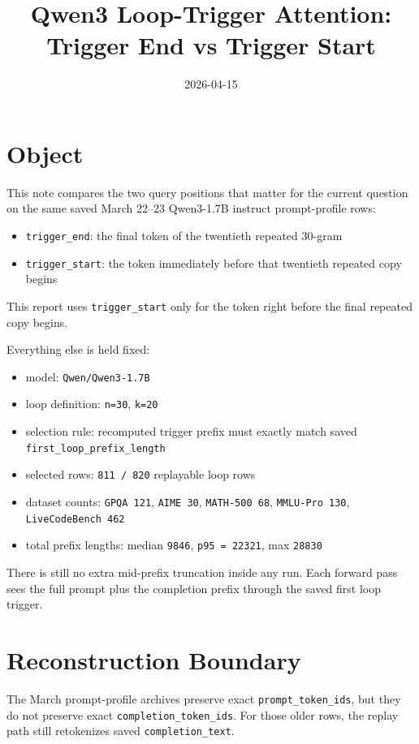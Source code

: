 \documentclass[11pt]{article}
\title{Qwen3 Loop-Trigger Attention: Trigger End vs Trigger Start}
\author{}
\date{2026-04-15}
\begin{document}
\maketitle

\section*{Object}

This note compares the two query positions that matter for the current question on the same saved March 22--23 Qwen3-1.7B instruct prompt-profile rows:

\begin{itemize}
  \item \texttt{trigger\_end}: the final token of the twentieth repeated $30$-gram
  \item \texttt{trigger\_start}: the token immediately before that twentieth repeated copy begins
\end{itemize}

This report uses \texttt{trigger\_start} only for the token right before the final repeated copy begins.

Everything else is held fixed:

\begin{itemize}
  \item model: \texttt{Qwen/Qwen3-1.7B}
  \item loop definition: \texttt{n=30}, \texttt{k=20}
  \item selection rule: recomputed trigger prefix must exactly match saved \texttt{first\_loop\_prefix\_length}
  \item selected rows: \texttt{811 / 820} replayable loop rows
  \item dataset counts: \texttt{GPQA 121}, \texttt{AIME 30}, \texttt{MATH-500 68}, \texttt{MMLU-Pro 130}, \texttt{LiveCodeBench 462}
  \item total prefix lengths: median \texttt{9846}, \texttt{p95 = 22321}, max \texttt{28830}
\end{itemize}

There is still no extra mid-prefix truncation inside any run. Each forward pass sees the full prompt plus the completion prefix through the saved first loop trigger.

\section*{Reconstruction Boundary}

The March prompt-profile archives preserve exact \texttt{prompt\_token\_ids}, but they do not preserve exact \texttt{completion\_token\_ids}. For those older rows, the replay path still retokenizes saved \texttt{completion\_text}.
\end{document}
